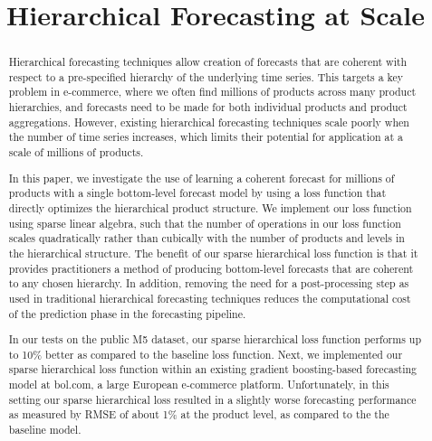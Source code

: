 \documentclass[preprint, 3p, times, twocolumn]{elsarticle}
\begin{document}
\begin{frontmatter}

\title{Hierarchical Forecasting at Scale}

\author{}



\begin{abstract}
  Hierarchical forecasting techniques allow creation of forecasts that are coherent with respect to a pre-specified hierarchy of the underlying time series. This targets a key problem in e-commerce, where we often find millions of products across many product hierarchies, and forecasts need to be made for both individual products and product aggregations. However, existing hierarchical forecasting techniques scale poorly when the number of time series increases, which limits their potential for application at a scale of millions of products. 
  
  In this paper, we investigate the use of learning a coherent forecast for millions of products with a single bottom-level forecast model by using a loss function that directly optimizes the hierarchical product structure. We implement our loss function using sparse linear algebra, such that the number of operations in our loss function scales quadratically rather than cubically with the number of products and levels in the hierarchical structure. The benefit of our sparse hierarchical loss function is that it provides practitioners a method of producing bottom-level forecasts that are coherent to any chosen hierarchy. In addition, removing the need for a post-processing step as used in traditional hierarchical forecasting techniques reduces the computational cost of the prediction phase in the forecasting pipeline. 
  
  In our tests on the public M5 dataset, our sparse hierarchical loss function performs up to 10\% better as compared to the baseline loss function. Next, we implemented our sparse hierarchical loss function within an existing gradient boosting-based forecasting model at bol.com, a large European e-commerce platform. Unfortunately, in this setting our sparse hierarchical loss resulted in a slightly worse forecasting performance as measured by RMSE of about 1\% at the product level, as compared to the the baseline model. 
  

\end{abstract}
\end{frontmatter}
\end{document}

